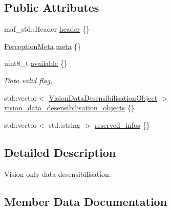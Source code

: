 \subsection*{Public Attributes}
\begin{DoxyCompactItemize}
\item 
maf\+\_\+std\+::\+Header \hyperlink{structmaf__perception__interface_1_1VisionDataDesensibilisationPerception_a89717f020d15117f98ec5962670efe14}{header} \{\}
\item 
\hyperlink{structmaf__perception__interface_1_1PerceptionMeta}{Perception\+Meta} \hyperlink{structmaf__perception__interface_1_1VisionDataDesensibilisationPerception_a1cd223018b59cde678071e8e76b87ed5}{meta} \{\}
\item 
uint8\+\_\+t \hyperlink{structmaf__perception__interface_1_1VisionDataDesensibilisationPerception_a30c18deae7b497b4e1c56570be5e2da5}{available} \{\}
\begin{DoxyCompactList}\small\item\em Data valid flag. \end{DoxyCompactList}\item 
std\+::vector$<$ \hyperlink{structmaf__perception__interface_1_1VisionDataDesensibilisationObject}{Vision\+Data\+Desensibilisation\+Object} $>$ \hyperlink{structmaf__perception__interface_1_1VisionDataDesensibilisationPerception_a39d7febccc4fcfcac5f73fab5730dc00}{vision\+\_\+data\+\_\+desensibilisation\+\_\+objects} \{\}
\item 
std\+::vector$<$ std\+::string $>$ \hyperlink{structmaf__perception__interface_1_1VisionDataDesensibilisationPerception_a25ab71c64d24cad9bcc1025d912207db}{reserved\+\_\+infos} \{\}
\end{DoxyCompactItemize}


\subsection{Detailed Description}
Vision only data desensibilisation. 

\subsection{Member Data Documentation}
\mbox{\label{structmaf__perception__interface_1_1VisionDataDesensibilisationPerception_a30c18deae7b497b4e1c56570be5e2da5}} 
